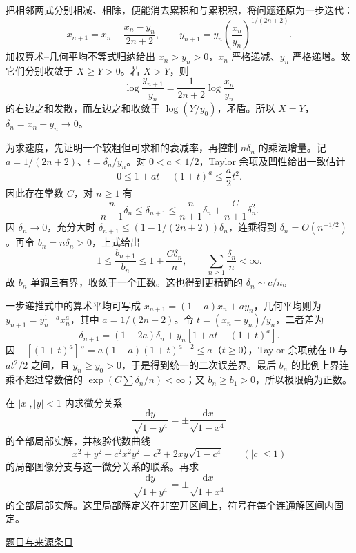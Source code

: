 \documentclass[UTF8,12pt,a4paper,fontset=fandol]{ctexart}
\begin{document}
\begin{solve}\label{ans:fin16-low:9}

把相邻两式分别相减、相除，便能消去累积和与累积积，将问题还原为一步迭代：
\[
x_{n+1}=x_n-\frac{x_n-y_n}{2n+2},\qquad
y_{n+1}=y_n\left(\frac{x_n}{y_n}\right)^{1/(2n+2)}.
\]
加权算术--几何平均不等式归纳给出 $x_n>y_n>0$，$x_n$ 严格递减、$y_n$ 严格递增。故它们分别收敛于 $X\ge Y>0$。若 $X>Y$，则
\[
\log\frac{y_{n+1}}{y_n}=\frac1{2n+2}\log\frac{x_n}{y_n}
\]
的右边之和发散，而左边之和收敛于 $\log(Y/y_0)$，矛盾。所以 $X=Y$，$\delta_n=x_n-y_n\to0$。

为求速度，先证明一个较粗但可求和的衰减率，再控制 $n\delta_n$ 的乘法增量。记 $a=1/(2n+2)$、$t=\delta_n/y_n$。对 $0<a\le1/2$，Taylor 余项及凹性给出一致估计
\[
0\le1+at-(1+t)^a\le\frac a2t^2.
\]
因此存在常数 $C$，对 $n\ge1$ 有
\[
\frac n{n+1}\delta_n\le\delta_{n+1}
\le\frac n{n+1}\delta_n+\frac C{n+1}\delta_n^2.
\]
因 $\delta_n\to0$，充分大时 $\delta_{n+1}\le(1-1/(2n+2))\delta_n$，连乘得到 $\delta_n=O(n^{-1/2})$。再令 $b_n=n\delta_n>0$，上式给出
\[
1\le\frac{b_{n+1}}{b_n}\le1+\frac{C\delta_n}{n},
\qquad\sum_{n\ge1}\frac{\delta_n}{n}<\infty.
\]
故 $b_n$ 单调且有界，收敛于一个正数。这也得到更精确的 $\delta_n\sim c/n$。

一步递推式中的算术平均可写成 $x_{n+1}=(1-a)x_n+ay_n$，几何平均则为 $y_{n+1}=y_n^{1-a}x_n^a$，其中 $a=1/(2n+2)$。令 $t=(x_n-y_n)/y_n$，二者差为
\[
\delta_{n+1}=(1-2a)\delta_n+y_n[1+at-(1+t)^a].
\]
因 $-[(1+t)^a]''=a(1-a)(1+t)^{a-2}\le a$（$t\ge0$），Taylor 余项就在 $0$ 与 $at^2/2$ 之间，且 $y_n\ge y_0>0$，于是得到统一的二次误差界。最后 $b_n$ 的比例上界连乘不超过常数倍的 $\exp(C\sum\delta_n/n)<\infty$；又 $b_n\ge b_1>0$，所以极限确为正数。

\end{solve}

\begin{example}\label{ex:fin16-low:10}\label{pr:fin16-low:10}

在 $|x|,|y|<1$ 内求微分关系
\[
\frac{\mathrm dy}{\sqrt{1-y^4}}=\pm\frac{\mathrm dx}{\sqrt{1-x^4}}
\]
的全部局部实解，并核验代数曲线
\[
x^2+y^2+c^2x^2y^2=c^2+2xy\sqrt{1-c^4}\qquad(|c|\le1)
\]
的局部图像分支与这一微分关系的联系。再求
\[
\frac{\mathrm dy}{\sqrt{1+y^4}}=\pm\frac{\mathrm dx}{\sqrt{1+x^4}}
\]
的全部局部实解。这里局部解定义在非空开区间上，符号在每个连通解区间内固定。

\par\href{https://github.com/lzxcr/cmc-mathematics/blob/64916fa1fdbc3e444a652eca204d5669058ee321/src/problems/finals/16/12.md}{题目与来源条目}

\end{example}
\end{document}
